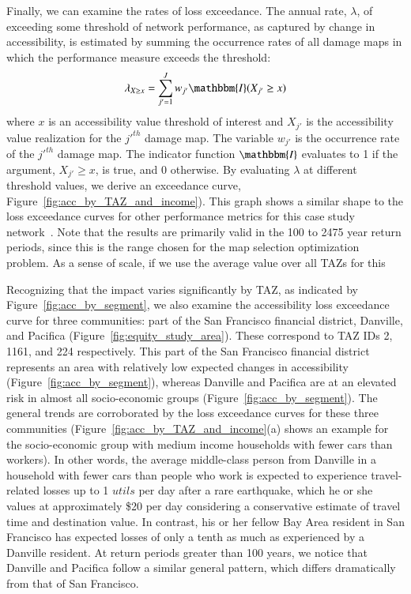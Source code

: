 Finally, we can examine the rates of loss exceedance. The annual rate, $\lambda$, of exceeding some threshold of network performance, as captured by change in accessibility, is estimated by summing the occurrence rates of all damage maps in which the performance measure exceeds the threshold: 
\begin{equation}
\lambda_{X \geq x} = \sum_{j'=1}^{J} w_{j'} \mathbbm{I}(X_{j'}\geq x)
\label{eq:exceedance}
\end{equation}
where $x$ is an accessibility value threshold of interest and $X_{j'}$ is the accessibility value realization for the $j'^{th}$ damage map. The variable $w_{j'}$ is the occurrence rate of the $j'^{th}$ damage map.%
The indicator function $\mathbbm{I}$  evaluates to 1 if the argument, $X_{j'} \geq x$, is true, and 0 otherwise.
By evaluating $\lambda$ at different threshold values, we derive an exceedance curve, Figure~\ref{fig:acc_by_TAZ_and_income}). This graph shows a similar shape to the loss exceedance curves for other performance metrics for this case study network~\cite{miller_seismic_2014}. Note that the results are primarily valid in the 100 to 2475 year return periods, since this is the range chosen for the map selection optimization problem. As a sense of scale, if we use the average value over all TAZs for this 

Recognizing that the impact varies significantly by TAZ, as indicated by Figure~\ref{fig:acc_by_segment},
we also examine the accessibility loss exceedance curve for three communities: part of the San Francisco financial district, Danville, and Pacifica (Figure~\ref{fig:equity_study_area}). These correspond to TAZ IDs 2, 1161, and 224 respectively. This part of the San Francisco financial district  represents an area with relatively low expected changes in accessibility (Figure~\ref{fig:acc_by_segment}), whereas Danville and Pacifica are at an elevated risk in almost all socio-economic groups (Figure~\ref{fig:acc_by_segment}). 
The general trends are corroborated by the loss exceedance curves for these three communities (Figure~\ref{fig:acc_by_TAZ_and_income}{(a)} shows an example for the socio-economic group with medium income households with fewer cars than workers). In other words, the average middle-class person from Danville in a household with fewer cars than people who work is expected to experience travel-related losses up to 1 $utils$ per day after a rare earthquake, which he or she values at approximately \$20 per day considering a conservative estimate of travel time and destination value. In contrast, his or her fellow Bay Area resident in San Francisco has expected losses of only a tenth as much as experienced by a Danville resident. At return periods greater than 100 years, we notice that Danville and Pacifica follow a similar general pattern, which differs dramatically from that of San Francisco. 

